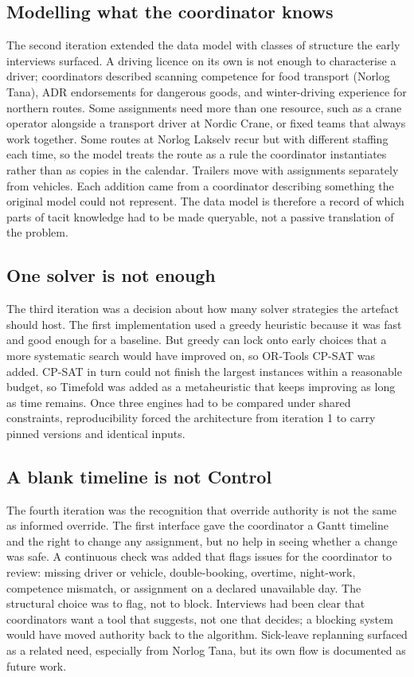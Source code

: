 \subsection{Modelling what the coordinator knows}
\label{sec:data-modelling}

The second iteration extended the data model with classes of structure the early interviews surfaced. A driving licence on its own is not enough to characterise a driver; coordinators described scanning competence for food transport (Norlog Tana), ADR endorsements for dangerous goods, and winter-driving experience for northern routes. Some assignments need more than one resource, such as a crane operator alongside a transport driver at Nordic Crane, or fixed teams that always work together. Some routes at Norlog Lakselv recur but with different staffing each time, so the model treats the route as a rule the coordinator instantiates rather than as copies in the calendar. Trailers move with assignments separately from vehicles. Each addition came from a coordinator describing something the original model could not represent. The data model is therefore a record of which parts of tacit knowledge had to be made queryable, not a passive translation of the problem.

\subsection{One solver is not enough}
\label{sec:solver-layer}

The third iteration was a decision about how many solver strategies the artefact should host. The first implementation used a greedy heuristic because it was fast and good enough for a baseline. But greedy can lock onto early choices that a more systematic search would have improved on, so OR-Tools CP-SAT was added. CP-SAT in turn could not finish the largest instances within a reasonable budget, so Timefold was added as a metaheuristic that keeps improving as long as time remains. Once three engines had to be compared under shared constraints, reproducibility forced the architecture from iteration 1 to carry pinned versions and identical inputs.

\subsection{A blank timeline is not Control}
\label{sec:hitl-deviations}

The fourth iteration was the recognition that override authority is not the same as informed override. The first interface gave the coordinator a Gantt timeline and the right to change any assignment, but no help in seeing whether a change was safe. A continuous check was added that flags issues for the coordinator to review: missing driver or vehicle, double-booking, overtime, night-work, competence mismatch, or assignment on a declared unavailable day. The structural choice was to flag, not to block. Interviews had been clear that coordinators want a tool that suggests, not one that decides; a blocking system would have moved authority back to the algorithm. Sick-leave replanning surfaced as a related need, especially from Norlog Tana, but its own flow is documented as future work.

